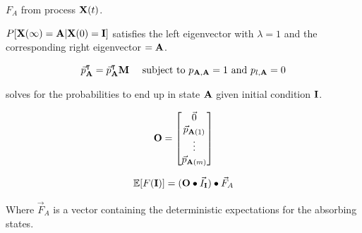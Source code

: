 \documentclass{beamer}
\begin{document}
\begin{frame}{$F_A$ from process $\bold{X}(t)$.}
    
    $P[\bold{X}(\infty) = \bold{A}| \bold{X}(0) = \bold{I}]$ satisfies the left eigenvector with $\lambda = 1$ and the corresponding right eigenvector $=\bold{A}$.
    
    \begin{equation*}
        \vec{p}_\bold{A}^\intercal = \vec{p}_\bold{A}^\intercal \bold{M} \ \ \ \  \text{subject to } p_{\bold{A},\bold{A}}=1 \ \text{and}\ p_{l,\bold{A}}=0
    \end{equation*}
    
    solves for the probabilities to end up in state $\bold{A}$ given initial condition $\bold{I}$.  
    
    \begin{equation*}
    \bold{O}=
        \begin{bmatrix}
        \vec{0}  \\
        \vec{p}_{\bold{A}(1)}  \\
        \vdots  \\
        \vec{p}_{\bold{A}(m)} 
    \end{bmatrix}   
    \end{equation*}
     
    \begin{equation*}
        \mathbb{E}[F(\bold{I})] = (\bold{O} \bullet \vec{I}_\bold{I}) \bullet \vec{F}_A   %
    \end{equation*}
    
    Where $\vec{F}_A$ is a vector containing the deterministic expectations for the absorbing states.
\end{frame}
\end{document}
